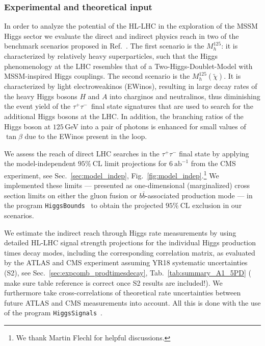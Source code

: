 \subsubsection{Experimental and theoretical input}

In order to analyze the potential of the HL-LHC in the exploration of the MSSM Higgs sector we evaluate the direct and indirect physics reach in two of the benchmark scenarios proposed in Ref.~\cite{Bahl:2018zmf}. The first scenario is the $M_h^{125}$: it is characterized by relatively heavy superparticles, such that the Higgs phenomenology at the LHC resembles that of a Two-Higgs-Doublet-Model with MSSM-inspired Higgs couplings. The second scenario is the $M_h^{125}(\tilde{\chi})$. It is characterized by light electroweakinos (EWinos), resulting in large decay rates of the heavy Higgs bosons $H$ and $A$ into charginos and neutralinos, thus diminishing the event yield of the $\tau^+\tau^-$~final state signatures that are used to search
for the additional Higgs bosons at the LHC. In addition, the branching ratios of the Higgs boson at $125$\,GeV into a pair of photons is enhanced for small values of $\tan\beta$ due to the EWinos present in the loop.

We assess the reach of direct LHC searches in the  $\tau^+\tau^-$
final state by applying the model-independent $95\%~\mathrm{CL}$
limit projections for $6~\mathrm{ab}^{-1}$ from the CMS experiment, see Sec.~\ref{sec:model_indep}, Fig.~\ref{fig:model_indep}.\footnote{We thank Martin Flechl for helpful discussions.} 
We implemented these limits --- presented as one-dimensional (marginalized) cross section limits on either the
gluon fusion or $b\bar{b}$-associated production mode --- in the program
\texttt{HiggsBounds}~\cite{Bechtle:2008jh,Bechtle:2011sb,Bechtle:2013wla,Bechtle:2015pma} to obtain the projected $95\%~\mathrm{CL}$ exclusion in our scenarios.

We estimate the indirect reach through Higgs rate measurements by
using detailed HL-LHC signal strength projections for the individual
Higgs production times decay modes, including the corresponding
correlation matrix, as evaluated by the ATLAS and CMS experiment assuming YR18 systematic uncertainties (S2), see Sec.~\ref{sec:expcomb_prodtimesdecay}, Tab.~\ref{tab:summary_A1_5PD} {(\color{green} make sure table reference is correct once S2 results are included!)}.  We furthermore take cross-correlations of theoretical
rate uncertainties between future ATLAS and CMS measurements into
account. All this is done with the use of the program
\texttt{HiggsSignals}~\cite{Bechtle:2013xfa}. 

